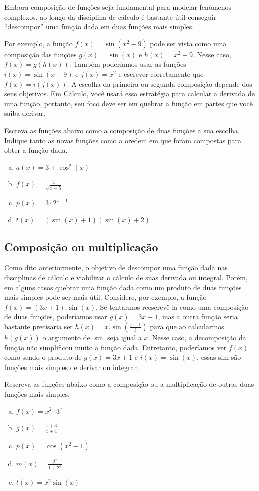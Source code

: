 \documentclass[main_estudante.tex]{subfiles}
\begin{document}
Embora composição de funções seja fundamental para modelar fenômenos complexos, ao longo da disciplina de cálculo é bastante útil conseguir ``descompor'' uma função dada em duas funções mais simples.

Por exemplo, a função $f(x)=\sin(x^2-9)$ pode ser vista como uma composição das funções $g(x)=\sin(x)$ e $h(x)=x^2-9$. Nesse caso, $f(x)=g(h(x))$. Também poderíamos usar as funções $i(x)=\sin(x-9)$ e $j(x)=x^2$ e escrever corretamente que $f(x)=i(j(x))$. A escolha da primeira ou segunda composição depende dos seus objetivos. Em Cálculo, você usará essa estratégia para calcular a derivada de uma função, portanto, seu foco deve ser em quebrar a função em partes que você saiba derivar.

\begin{questao}
Escreva as funções abaixo como a composição de duas funções a sua escolha. Indique tanto as novas funções como a oredem em que foram compostas para obter a função dada.
\begin{enumerate}[a)]
\item $a(x)=3+\cos^2(x)$
\item $f(x)=\frac{1}{\sqrt{x-5}}$
\item $p(x)=3 \cdot 2^{x-1}$
\item $t(x)=(\sin(x)+1)(\sin(x)+2)$
\end{enumerate}
\end{questao}

\subsection*{Composição ou multiplicação}

Como dito anteriormente, o objetivo de descompor uma função dada nas disciplinas de cálculo e viabilizar o cálculo de suas derivada ou integral. Porém, em alguns casos quebrar uma função dada como um produto de duas funções mais simples pode ser mais útil. Considere, por exemplo, a função $f(x)=(3x+1).\sin(x)$. Se tentarmos reescrevê-la como uma composição de duas funções, poderíamos usar $g(x)=3x+1$, mas a outra função seria bastante precisaria ser $h(x)=x.\sin(\frac{x-1}{3})$ para que ao calcularmos $h(g(x))$ o argumento de $\sin$ seja igual a $x$. Nesse caso, a decomposição da função não simplificou muito a função dada. Entretanto, poderíamos ver $f(x)$ como sendo o produto de $g(x)=3x+1$ e $i(x)=\sin(x)$, essas sim são funções mais simples de derivar ou integrar.

\begin{questao}
Rescreva as funções abaixo como a composição ou a multiplicação de outras duas funções mais simples.
\begin{enumerate}[a)]
\item $f(x)=x^2 \cdot 3^x$
\item $g(x)=\frac{x+3}{x+4}$
\item $p(x)=\cos(x^2-1)$
\item $m(x)=\frac{2^x}{1+2^x}$
\item $t(x)=x^2\sin(x)$
\end{enumerate}
\end{questao}
\end{document}

